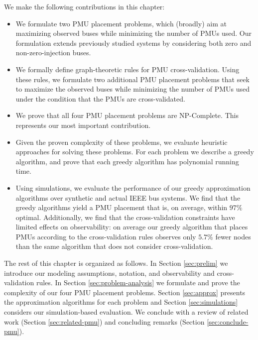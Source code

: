 We make the following contributions in this chapter: 
\begin{itemize}
    
	\item We formulate two PMU placement problems, which (broadly) aim at maximizing observed buses while minimizing the number of PMUs used. Our formulation extends previously studied systems by 
	considering both zero and non-zero-injection buses.

    \item We formally define graph-theoretic rules for PMU cross-validation. Using these rules, we formulate two additional PMU placement problems that seek to maximize the observed buses while minimizing
	the number of PMUs used under the condition that the PMUs are cross-validated. 

    \item We prove that all four PMU placement problems are NP-Complete. This represents our most important contribution.

	\item Given the proven complexity of these problems, we evaluate heuristic approaches for solving these problems. For each problem we describe a greedy algorithm, and prove that each greedy
	algorithm has polynomial running time.

	\item Using simulations, we evaluate the performance of our greedy approximation algorithms over synthetic and actual
	IEEE bus systems. We find that the greedy algorithms yield a PMU placement that is, on average, within $97\%$ optimal. Additionally, we find that 
	the cross-validation constraints have limited effects on observability: on average our greedy algorithm that places PMUs according to the cross-validation rules observes 
	only $5.7\%$ fewer nodes than the same algorithm that does not consider cross-validation.

\end{itemize}

The rest of this chapter is organized as follows. In Section \ref{sec:prelim} we introduce our modeling assumptions, notation, and observability and cross-validation rules. In Section \ref{sec:problem-analysis} we formulate and prove the complexity of our four PMU placement problems. Section \ref{sec:approx} presents the approximation algorithms for each problem and Section \ref{sec:simulations} considers our simulation-based evaluation. We conclude with a review of related work (Section \ref{sec:related-pmu}) 
and concluding remarks (Section \ref{sec:conclude-pmu}).
